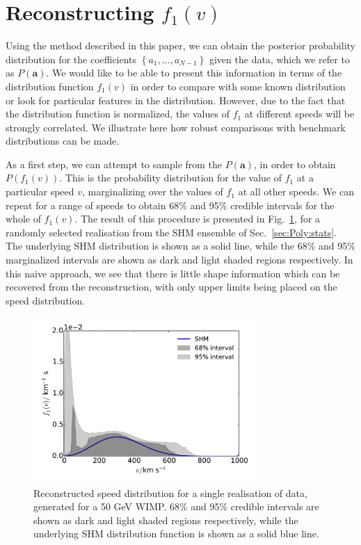 \section{Reconstructing $f_1(v)$}
\label{sec:Poly:Recon}

Using the method described in this paper, we can obtain the posterior probability distribution for the coefficients $\left\{ a_1, ..., a_{N-1}\right\}$ given the data, which we refer to as $P(\textbf{a})$. We would like to be able to present this information in terms of the distribution function $f_1(v)$ in order to compare with some known distribution or look for particular features in the distribution. However, due to the fact that the distribution function is normalized, the values of $f_1$ at different speeds will be strongly correlated. We illustrate here how robust comparisons with benchmark distributions can be made.

As a first step, we can attempt to sample from the $P(\textbf{a})$, in order to obtain $P(f_1(v))$. This is the probability distribution for the value of $f_1$ at a particular speed $v$, marginalizing over the values of $f_1$ at all other speeds. We can repeat for a range of speeds to obtain 68\% and 95\% credible intervals for the whole of $f_1(v)$. The result of this procedure is presented in Fig.~\ref{fig:Poly:f}, for a randomly selected realisation from the SHM ensemble of Sec.~\ref{sec:Poly:stats}. The underlying SHM distribution is shown as a solid line, while the 68\% and 95\% marginalized intervals are shown as dark and light shaded regions respectively. In this naive approach, we see that there is little shape information which can be recovered from the reconstruction, with only upper limits being placed on the speed distribution.

\begin{figure}[t]
\centering
  \includegraphics[width=0.75\textwidth]{Poly/f_SHM.pdf}
  \caption[Reconstructed speed distribution for a single realisation of data using the polynomial $\ln f(v)$ parametrisation]{Reconstructed speed distribution for a single realisation of data, generated for a 50 GeV WIMP. 68\% and 95\% credible intervals are shown as dark and light shaded regions respectively, while the underlying SHM distribution function is shown as a solid blue line.}
  \label{fig:Poly:f}
\end{figure}


